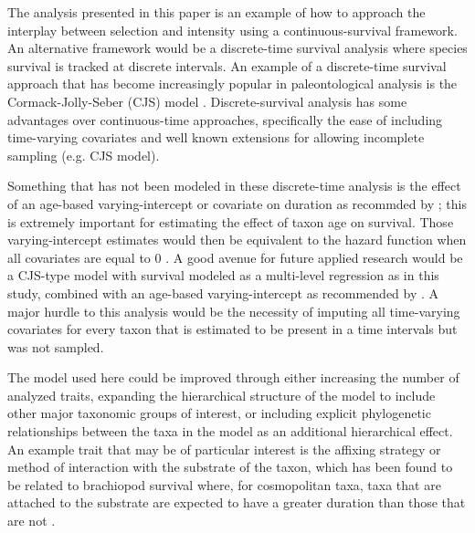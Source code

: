 \documentclass[11pt]{article}
\begin{document}
The analysis presented in this paper is an example of how to approach the interplay between selection and intensity using a continuous-survival framework. An alternative framework would be a discrete-time survival analysis \citep{Tutz2016} where species survival is tracked at discrete intervals. An example of a discrete-time survival approach that has become increasingly popular in paleontological analysis is the Cormack-Jolly-Seber (CJS) model \citep{Royle2008,Liow2008,Tomiya2013,Liow2010b}. Discrete-survival analysis has some advantages over continuous-time approaches, specifically the ease of including time-varying covariates and well known extensions for allowing incomplete sampling (e.g. CJS model). 

Something that has not been modeled in these discrete-time analysis is the effect of an age-based varying-intercept or covariate on duration as recommded by \citet{Tutz2016}; this is extremely important for estimating the effect of taxon age on survival. Those varying-intercept estimates would then be equivalent to the hazard function when all covariates are equal to 0 \citep{Tutz2016}. A good avenue for future applied research would be a CJS-type model with survival modeled as a multi-level regression as in this study, combined with an age-based varying-intercept as recommended by \citet{Tutz2016}. A major hurdle to this analysis would be the necessity of imputing all time-varying covariates for every taxon that is estimated to be present in a time intervals but was not sampled.



The model used here could be improved through either increasing the number of analyzed traits, expanding the hierarchical structure of the model to include other major taxonomic groups of interest, or including explicit phylogenetic relationships between the taxa in the model as an additional hierarchical effect. An example trait that may be of particular interest is the affixing strategy or method of interaction with the substrate of the taxon, which has been found to be related to brachiopod survival where, for cosmopolitan taxa, taxa that are attached to the substrate are expected to have a greater duration than those that are not \citep{Alexander1977}.
\end{document}
